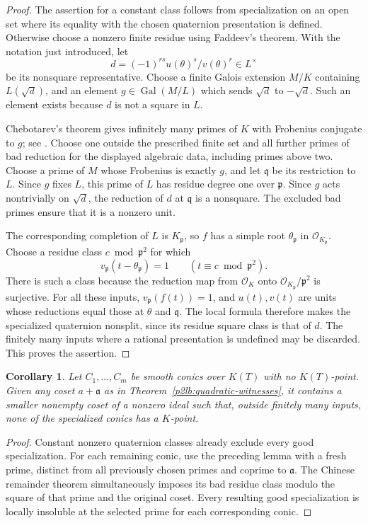 \documentclass[11pt]{article}
\newtheorem{corollary}[theorem]{Corollary}
\theoremstyle{definition}
\begin{document}
\begin{proof}
The assertion for a constant class follows from specialization on an
open set where its equality with the chosen quaternion presentation is
defined.  Otherwise choose a nonzero finite residue using Faddeev's
theorem.  With the notation just introduced, let
\[
 d=(-1)^{rs}u(\theta)^s/v(\theta)^r\in L^\times
\]
be its nonsquare representative.  Choose a finite Galois extension
$M/K$ containing $L(\sqrt d)$, and an element
$g\in\operatorname{Gal}(M/L)$ which sends $\sqrt d$ to $-\sqrt d$.
Such an element exists because $d$ is not a square in $L$.

Chebotarev's theorem gives infinitely many primes of $K$ with Frobenius
conjugate to $g$; see \cite[Section~2.1, Theorem~1]{p2lbSerre1981}.
Choose one outside the prescribed finite set and all further primes of
bad reduction for the displayed algebraic data, including primes above
two.  Choose a prime of $M$ whose Frobenius is exactly $g$, and let
$\mathfrak q$ be its restriction to $L$.  Since $g$ fixes $L$, this
prime of $L$ has residue degree one over $\mathfrak p$.  Since $g$
acts nontrivially on $\sqrt d$, the reduction of $d$ at
$\mathfrak q$ is a nonsquare.  The excluded bad primes ensure that
it is a nonzero unit.

The corresponding completion of $L$ is $K_{\mathfrak p}$, so
$f$ has a simple root $\theta_{\mathfrak p}$ in
$\mathcal O_{K_{\mathfrak p}}$.  Choose a residue class
$c\bmod\mathfrak p^2$ for which
\[
 v_{\mathfrak p}(t-\theta_{\mathfrak p})=1
 \qquad(t\equiv c\bmod\mathfrak p^2).
\]
There is such a class because the reduction map from $\mathcal O_K$
onto $\mathcal O_{K_{\mathfrak p}}/\mathfrak p^2$ is surjective.
For all these inputs, $v_{\mathfrak p}(f(t))=1$, and $u(t),v(t)$
are units whose reductions equal those at $\theta$ and
$\mathfrak q$.  The local formula therefore makes the specialized
quaternion nonsplit, since its residue square class is that of $d$.
The finitely many inputs where a rational presentation is undefined may
be discarded.  This proves the assertion.
\end{proof}

\begin{corollary}\label{p2lb:simultaneous-conics}
Let $C_1,\ldots,C_m$ be smooth conics over $K(T)$ with no
$K(T)$-point.  Given any coset $a+\mathfrak a$ as in
Theorem~\ref{p2lb:quadratic-witnesses}, it contains a smaller nonempty
coset of a nonzero ideal such that, outside finitely many inputs, none
of the specialized conics has a $K$-point.
\end{corollary}
\begin{proof}
Constant nonzero quaternion classes already exclude every good
specialization.  For each remaining conic, use the preceding lemma
with a fresh prime, distinct from all previously chosen primes and
coprime to $\mathfrak a$.  The Chinese remainder theorem simultaneously
imposes its bad residue class modulo the square of that prime and the
original coset.  Every resulting good specialization is locally insoluble
at the selected prime for each corresponding conic.
\end{proof}
\end{document}
